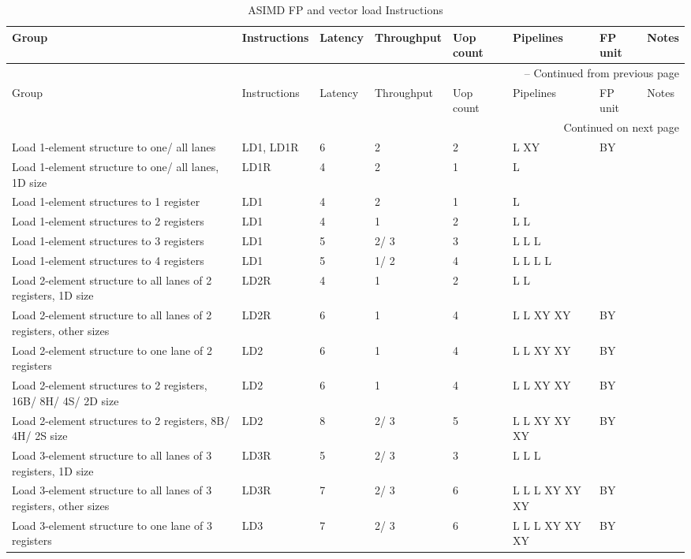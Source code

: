 \newpage
\begin{longtable}{|p{1in}|p{1in}|l|l|l|p{1in}|l|p{1in}|}
\caption{ASIMD FP and vector load Instructions} \\
\hline
Group & Instructions & Latency & Throughput & Uop count & Pipelines & FP unit & Notes\\
\hline
\endfirsthead
\hline
\multicolumn{8}{|r|}{{\tablename\ \thetable{} -- Continued from previous page}} \\
\hline
Group & Instructions & Latency & Throughput & Uop count & Pipelines & FP unit & Notes\\
\hline
\endhead
\hline
\multicolumn{8}{|r|}{{Continued on next page}} \\
\hline
\endfoot
\hline
\endlastfoot
Load 1-element structure to one/ all lanes & LD1, LD1R & 6 & 2 & 2 & L XY & BY & \\
\hline
Load 1-element structure to one/ all lanes, 1D size & LD1R & 4 & 2 & 1 & L &  & \\
\hline
Load 1-element structures to 1 register & LD1 & 4 & 2 & 1 & L &  & \\
\hline
Load 1-element structures to 2 registers & LD1 & 4 & 1 & 2 & L L &  & \\
\hline
Load 1-element structures to 3 registers & LD1 & 5 & 2/ 3 & 3 & L L L &  & \\
\hline
Load 1-element structures to 4 registers & LD1 & 5 & 1/ 2 & 4 & L L L L &  & \\
\hline
Load 2-element structure to all lanes of 2 registers, 1D size & LD2R & 4 & 1 & 2 & L L &  & \\
\hline
Load 2-element structure to all lanes of 2 registers, other sizes & LD2R & 6 & 1 & 4 & L L XY XY & BY & \\
\hline
Load 2-element structure to one lane of 2 registers & LD2 & 6 & 1 & 4 & L L XY XY & BY & \\
\hline
Load 2-element structures to 2 registers, 16B/ 8H/ 4S/ 2D size & LD2 & 6 & 1 & 4 & L L XY XY & BY & \\
\hline
Load 2-element structures to 2 registers, 8B/ 4H/ 2S size & LD2 & 8 & 2/ 3 & 5 & L L XY XY XY & BY & \\
\hline
Load 3-element structure to all lanes of 3 registers, 1D size & LD3R & 5 & 2/ 3 & 3 & L L L &  & \\
\hline
Load 3-element structure to all lanes of 3 registers, other sizes & LD3R & 7 & 2/ 3 & 6 & L L L XY XY XY & BY & \\
\hline
Load 3-element structure to one lane of 3 registers & LD3 & 7 & 2/ 3 & 6 & L L L XY XY XY & BY & \\

\end{longtable}
